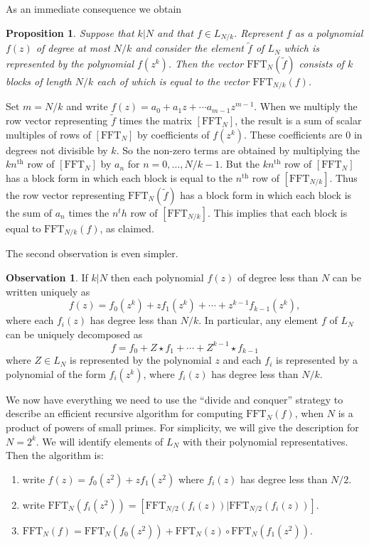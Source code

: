 \documentclass[12pt, letterpaper, oneside]{amsart}
\theoremstyle{definition}
\newtheorem{observation}[para]{Observation}
\theoremstyle{plain}
\newtheorem{proposition}[para]{Proposition}
\numberwithin{equation}{para}
\numberwithin{figure}{section}
\newcommand{\FFT}{\text{FFT}}
\renewcommand{\th}{\text{th}}
\begin{document}
As an immediate consequence we obtain 
\begin{proposition}
Suppose that $k|N$ and that $f\in L_{N/k}$.  Represent $f$ as a
polynomial $f(z)$ of degree at most $N/k$ and consider the element
$\widetilde f$ of $L_N$ which is represented by the polynomial
$f(z^k)$.  Then the vector $\FFT_N(\widetilde f)$ consists of $k$
blocks of length $N/k$ each of which is equal to the vector
$\FFT_{N/k}(f)$.
\end{proposition}
\proof Set $m = N/k$ and write
$f(z) = a_0 + a_1z + \cdots a_{m-1}z^{m-1}$.  When we multiply the row
vector representing $\widetilde f$ times the matrix $[\FFT_N]$, the
result is a sum of scalar multiples of rows of $[\FFT_N]$ by
coefficients of $f(z^k)$.  These coefficients are $0$ in degrees not
divisible by $k$.  So the non-zero terms are obtained by multiplying
the $kn^\th$ row of $[\FFT_N]$ by $a_n$ for $n=0, \ldots, N/k-1$.  But
the $kn^\th$ row of $[\FFT_N]$ has a block form in which each block is
equal to the $n^\th$ row of $[\FFT_{N/k}]$.  Thus the row vector
representing $\FFT_N(\widetilde f)$ has a block form in which each
block is the sum of $a_n$ times the $n^th$ row of $[\FFT_{N/k}]$.
This implies that each block is equal to $\FFT_{N/k}(f)$, as claimed.
\endproof

The second observation is even simpler.
\begin{observation}\label{observation:decomposition}
If $k|N$ then each polynomial $f(z)$ of degree less than $N$ can be
written uniquely as
$$f(z) = f_0(z^k)+ zf_1(z^k) + \cdots + z^{k-1}f_{k-1}(z^k),$$
where each $f_i(z)$ has degree less than $N/k$.  In particular, any
element $f$ of $L_N$ can be uniquely decomposed as
$$f = f_0+ Z\star f_1 + \cdots + Z^{k-1}\star f_{k-1}$$
where $Z\in L_N$ is represented by the polynomial $z$ and each $f_i$
is represented by a polynomial of the form $f_i(z^k)$, where $f_i(z)$
has degree less than $N/k$.
\end{observation}

We now have everything we need to use the ``divide and conquer''
strategy to describe an efficient recursive algorithm for computing
$\FFT_N(f)$, when $N$ is a product of powers of small primes.  For
simplicity, we will give the description for $N = 2^k$. We will
identify elements of $L_N$ with their polynomial representatives.
Then the algorithm is:

\begin{enumerate}
\item write $f(z) = f_0(z^2)+ zf_1(z^2)$ where $f_i(z)$ has degree less than $N/2$.
\item write $\FFT_N(f_i(z^2)) = [\FFT_{N/2}(f_i(z)) | \FFT_{N/2}(f_i(z))]$.
\item $\FFT_N(f) = \FFT_{N}(f_0(z^2)) + \FFT_{N}(z)\circ\FFT_{N}(f_1(z^2))$.
\end{enumerate}
\end{document}
